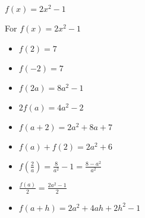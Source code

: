 {$f(x) = 2x^2 - 1$}
{For $f(x) = 2x^2-1$

\begin{itemize}
\item  $f(2) = 7$
\item  $f(-2) = 7$
\item  $f(2a) = 8a^2-1$
\item  $2 f(a) = 4a^2-2$
\item $f(a+2) = 2a^2+8a+7$
\item $f(a) + f(2) = 2a^2+6$
\item  $f \left( \frac{2}{a} \right) = \frac{8}{a^2} - 1 = \frac{8-a^2}{a^2}$
\item $\frac{f(a)}{2} =  \frac{2a^2-1}{2}$
\item  $f(a + h) = 2a^2+4ah+2h^2-1$
\end{itemize}
}